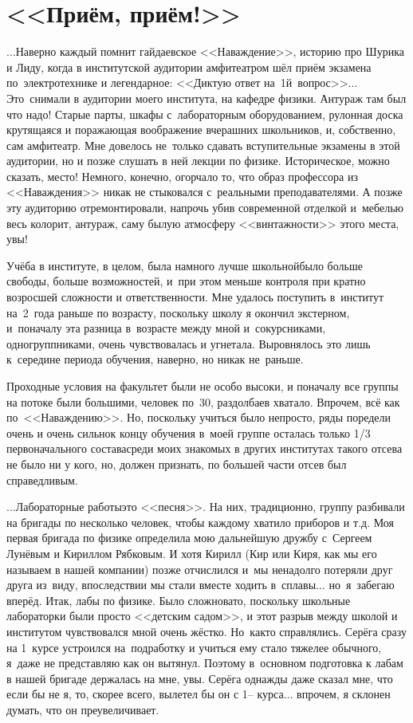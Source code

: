 \newpage
\section*{<<Приём, приём!>>}

$\ldots$Наверно каждый помнит гайдаевское <<Наваждение>>, историю про Шурика и Лиду, когда в институтской аудитории амфитеатром шёл приём экзамена по~электротехнике и легендарное: <<Диктую ответ на~1\sdash й~вопрос>>$\ldots$ Это~снимали в аудитории моего института, на кафедре физики. Антураж там был что надо! Старые парты, шкафы с~лабораторным оборудованием, рулонная доска крутящаяся и поражающая воображение вчерашних школьников, и, собственно, сам амфитеатр. Мне довелось не~только сдавать вступительные экзамены в этой аудитории, но и позже слушать в ней лекции по физике. Историческое, можно сказать, место! Немного, конечно, огорчало то, что образ профессора из <<Наваждения>> никак не стыковался с~реальными преподавателями. А позже эту аудиторию отремонтировали, напрочь убив современной отделкой и~мебелью весь колорит, антураж, саму былую атмосферу <<винтажности>> этого места, увы!

Учёба в институте, в целом, была намного лучше школьной\mdash было больше свободы, больше возможностей, и~при этом меньше контроля при кратно возросшей сложности и ответственности. Мне удалось поступить в~институт на~2~года раньше по возрасту, поскольку школу я окончил экстерном, и~поначалу эта разница в~возрасте между мной и~сокурсниками, одногруппниками, очень чувствовалась и угнетала. Выровнялось это лишь к~середине периода обучения, наверно, но никак не~раньше.

Проходные условия на факультет были не особо высоки, и поначалу все группы на потоке были большими, человек по~30, раздолбаев хватало. Впрочем, всё как по~<<Наваждению>>. Но, поскольку учиться было непросто, ряды поредели очень и очень сильно\mdash к концу обучения в~моей группе осталась только 1/3 первоначального состава\mdash среди моих знакомых в других институтах такого отсева не было ни у кого, но, должен признать, по большей части отсев был справедливым.

$\ldots$Лабораторные работы\mdash это <<песня>>. На них, традиционно, группу разбивали на бригады по несколько человек, чтобы каждому хватило приборов и т.д. Моя первая бригада по физике определила мою дальнейшую дружбу с~Сергеем Лунёвым и Кириллом Рябковым. И хотя Кирилл (Кир или Киря, как мы его называем в нашей компании) позже отчислился и~мы ненадолго потеряли друг друга из~виду, впоследствии мы стали вместе ходить в~сплавы$\ldots$ но~я~забегаю вперёд. Итак, лабы по физике. Было сложновато, поскольку школьные лабораторки были просто <<детским садом>>, и этот разрыв между школой и институтом чувствовался мной очень жёстко. Но~как\sdash то справлялись. Серёга сразу на 1~курсе устроился на~подработку и учиться ему стало тяжелее обычного, я~даже не представляю как он вытянул. Поэтому в~основном подготовка к лабам в нашей бригаде держалась на мне, увы. Серёга однажды даже сказал мне, что если бы не я, то, скорее всего, вылетел бы он с 1\thinspace\nobreakdash-- курса$\ldots$ впрочем, я склонен думать, что он преувеличивает. 

